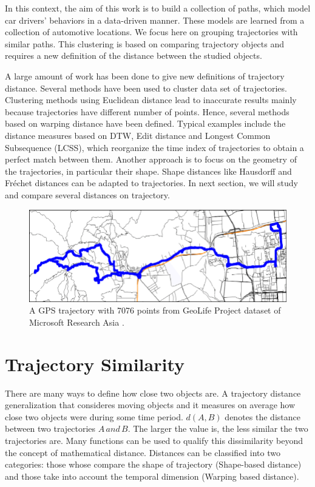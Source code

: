 \documentclass[a4paper, 12pt]{article}
\begin{document}
In this context, the aim of this work is to build a collection of paths, which model car drivers' behaviors in a data-driven manner.
These models are learned from a collection of automotive locations.
We focus here on grouping trajectories with similar paths.
This clustering is based on comparing trajectory objects and requires a new definition of the distance between the studied objects. 

A large amount of work has been done to give new definitions of trajectory distance. Several methods have been used to cluster
data set of trajectories. Clustering methods using Euclidean distance lead to inaccurate results mainly because trajectories have different number of points. Hence, several methods based on warping distance have been defined. Typical examples include the distance measures based on DTW, Edit distance and Longest Common Subsequence (LCSS), which reorganize the time index of trajectories to obtain a perfect match between them. Another approach is to focus on the geometry
of the trajectories, in particular their shape. Shape distances like Hausdorff and Fréchet distances can be adapted to trajectories. In next section, we will study and compare several distances on trajectory.

\begin{figure}[ht]
    \centering
    \includegraphics[width=1\textwidth]{Trajectory.png}
    \caption{A GPS trajectory with 7076 points from GeoLife Project dataset of Microsoft Research Asia \citep{qian2017simplifying}.}
    \label{fig3}
\end{figure}

\pagebreak

\section{Trajectory Similarity}
There are many ways to define how close two objects are. A trajectory distance generalization that consideres moving objects and it measures on average how close two objects were during some time period. $d(A,B)$ denotes the distance between two trajectories $A\,and\,B$. The larger the value is, the less similar the two trajectories are. Many functions can be used to qualify this dissimilarity beyond the concept of mathematical distance. Distances can be classified into two categories: those whose compare the shape of trajectory (Shape-based distance) and those take into account the temporal dimension (Warping based distance).
\end{document}
